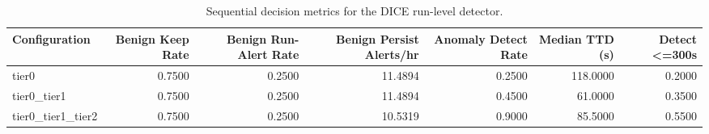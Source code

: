 \begin{table}[t]
\centering
\caption{Sequential decision metrics for the DICE run-level detector.}
\label{tab:dice_sequential_metrics}
\footnotesize
\begin{tabular}{lrrrrrr}
\toprule
Configuration & Benign Keep Rate & Benign Run-Alert Rate & Benign Persist Alerts/hr & Anomaly Detect Rate & Median TTD (s) & Detect <=300s \\
\midrule
tier0 & 0.7500 & 0.2500 & 11.4894 & 0.2500 & 118.0000 & 0.2000 \\
tier0_tier1 & 0.7500 & 0.2500 & 11.4894 & 0.4500 & 61.0000 & 0.3500 \\
tier0_tier1_tier2 & 0.7500 & 0.2500 & 10.5319 & 0.9000 & 85.5000 & 0.5500 \\
\bottomrule
\end{tabular}

\end{table}
